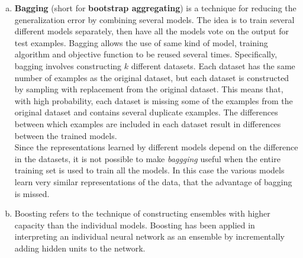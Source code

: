 \documentclass[fleqn]{article}
\begin{document}
\begin{enumerate}[a)]
	\item 
	\textbf{Bagging} (short for \textbf{bootstrap aggregating}) is a technique for reducing the generalization error by combining several models. The idea is to train several different models separately, then have all the models vote on the output for test examples. Bagging allows the use of same kind of model, training algorithm and objective function to be reused several times.
	Specifically, bagging involves constructing $k$ different datasets. Each dataset has the same number of examples as the original dataset, but each dataset is constructed by sampling with replacement from the original dataset. This means that, with high probability, each dataset is missing some of the examples from the original dataset and contains several duplicate examples. The differences between which examples are included in each dataset result in differences between the trained models. \hfill \break \\
	Since the representations learned by different models depend on the difference in the datasets, it is not possible to make \textit{baggging} useful when the entire training set is used to train all the models.  In this case the various models learn very similar representations of the data, that the advantage of bagging is missed.
	
	\item 
	Boosting refers to the technique of constructing ensembles with higher capacity than the individual models. 
	Boosting has been applied in interpreting an individual neural network as an ensemble by incrementally adding hidden units to the network.
	
\end{enumerate}
\end{document}
